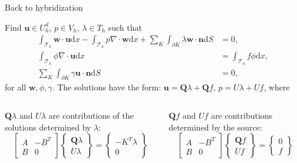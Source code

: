 \documentclass[9pt]{beamer}
\renewcommand\vec{\mathbf}
\begin{document}
\begin{frame}[c]{Back to hybridization}
\begin{tcolorbox}[title=Mixed Poisson example (Cockburn and
	Gopalakrishnan 2004)]
	Find $\vec{u} \in U^d_h$, $p \in V_h$,
	$\lambda \in T_h$ such that
	\begin{align*}
	\int_{\mathcal{T}_h}\vec{w}\cdot\vec{u}\mathrm{d}x
	- \int_{\mathcal{T}_h}p\nabla\cdot\vec{w}\mathrm{d}x
	+ \sum_K \int_{\partial K}\lambda\vec{w}\cdot\vec{n}\mathrm{d}S &= 0,\\
	\int_{\mathcal{T}_h}\phi\nabla\cdot\vec{u}\mathrm{d}x &=
	\int_{\mathcal{T}_h} f\phi\mathrm{d}x,\\
	\sum_K \int_{\partial K}\gamma\vec{u}\cdot\vec{n}\mathrm{d}S &= 0,
	\end{align*}
	for all $\vec{w},\phi,\gamma$. The solutions have the form:
	$\vec{u} = \vec{Q}\lambda + \vec{Q}f$, $p = U\lambda + Uf$,
	where
\end{tcolorbox}
\begin{columns}
	\begin{column}{0.5\textwidth}
	\begin{tcolorbox}[colback=blue!5!white,colframe=mDarkTeal]
		$\vec{Q}\lambda$ and $U\lambda$ are contributions
		of the solutions determined by $\lambda$:
		\begin{equation*}
		\begin{bmatrix}
		A & -B^T \\
		B & 0
		\end{bmatrix}
		\begin{Bmatrix}
		\vec{Q}\lambda \\
			U\lambda
		\end{Bmatrix} =
		\begin{Bmatrix}
		-K^T\lambda \\ 0
		\end{Bmatrix}
		\end{equation*}
	\end{tcolorbox}
	\end{column}
	\begin{column}{0.5\textwidth}
	\begin{tcolorbox}[colback=blue!5!white,colframe=mDarkTeal]
	$\vec{Q}f$ and $Uf$ are contributions
	determined by the source:
	\begin{equation*}
	\begin{bmatrix}
	A & -B^T \\
	B & 0
	\end{bmatrix}
	\begin{Bmatrix}
	\vec{Q}f \\
	Uf
	\end{Bmatrix} =
	\begin{Bmatrix}
	 0 \\ f
	\end{Bmatrix}
	\end{equation*}
	\end{tcolorbox}	
	\end{column}
\end{columns}
\end{frame}
\end{document}
